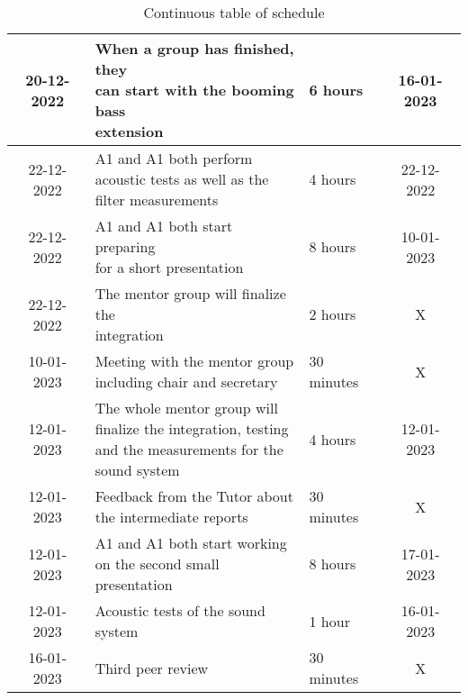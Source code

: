 \begin{table}[ht!]
\begin{tabular}{|c|l|l|c|}
         \hline
         20-12-2022 & \makecell[l]{When a group has finished, they \\ can start with the booming bass \\ extension} & 6 hours & 16-01-2023 \\
         \hline 
         22-12-2022 & \makecell[l]{A1\textunderscore1 and A1\textunderscore2 both perform \\ acoustic tests as well as the \\ filter measurements} & 4 hours & 22-12-2022 \\
         \hline
         22-12-2022 & \makecell[l]{A1\textunderscore1 and A1\textunderscore2 both start preparing \\ for a short presentation} & 8 hours & 10-01-2023 \\
         \hline
         22-12-2022 & \makecell[l]{The mentor group will finalize the \\ integration} & 2 hours & X \\
         \hline
         10-01-2023 & \makecell[l]{Meeting with the mentor group \\ including chair and secretary} & 30 minutes & X \\
         \hline
         12-01-2023 & \makecell[l]{The whole mentor group will \\ finalize the integration, testing \\ and the measurements for the \\ sound system} & 4 hours & 12-01-2023 \\
         \hline
         12-01-2023 & \makecell[l]{Feedback from the Tutor about \\ the intermediate reports} & 30 minutes & X \\
         \hline
         12-01-2023 & \makecell[l]{A1\textunderscore1 and A1\textunderscore2 both start working \\ on the second  small \\ presentation} & 8 hours & 17-01-2023 \\
         \hline
         12-01-2023 & Acoustic tests of the sound system & 1 hour & 16-01-2023 \\
         \hline
         16-01-2023 & Third peer review & 30 minutes & X \\
         \hline
         
    \end{tabular}
    \captionsetup{justification=centering}
    \caption{Continuous table of schedule}
    \label{tab:Table schedule 4.1.2}
\end{table}

